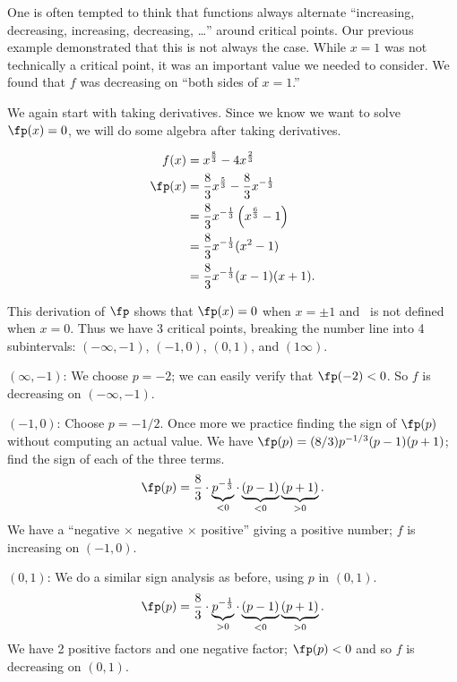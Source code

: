 One is often tempted to think that functions always alternate ``increasing, decreasing, increasing, decreasing, \ldots'' around critical points. Our previous example demonstrated that this is not always the case. While $x=1$ was not technically a critical point, it was an important value we needed to consider. We found that $f$ was decreasing on ``both sides of $x=1$.''

{We again start with taking derivatives. Since we know we want to solve $\fp(x) = 0$, we will do some algebra after taking derivatives.

\begin{align*}
f(x) &= x^{\frac{8}{3}}-4x^{\frac{2}{3}} \\
\fp(x) &= \frac83 x^{\frac53} - \frac83x^{-\frac13}\\
	&= \frac83x^{-\frac13}\left(x^{\frac63}-1\right)\\
	&=\frac83x^{-\frac13}(x^2-1)\\
	&=\frac83x^{-\frac13}(x-1)(x+1).
\end{align*}

This derivation of $\fp$ shows that $\fp(x) = 0$ when $x=\pm 1$ and \fp\ is not defined when $x=0$. Thus we have 3 critical points, breaking the number line into 4 subintervals: $(-\infty,-1)$, $(-1,0)$, $(0,1)$, and $(1\infty)$.

\iflatexml\begin{description}\else\begin{description}[leftmargin=0pt]\fi
\item[Interval 1,] $(\infty,-1)$: We choose $p=-2$; we can easily verify that $\fp(-2)<0$. So $f$ is decreasing on $(-\infty,-1)$.

\item[Interval 2,] $(-1,0)$: Choose $p=-1/2$. Once more we practice finding the sign of $\fp(p)$ without computing an actual value. We have $\fp(p) = (8/3)p^{-1/3}(p-1)(p+1)$; find the sign of each of the three terms. 
	\[\fp(p) = \frac 83 \cdot \underbrace{p^{-\frac13}}_{<0}\cdot \underbrace{(p-1)}_{<0}\underbrace{(p+1)}_{>0}.\]
	We have a ``negative $\times$ negative $\times$ positive'' giving a positive number; $f$ is increasing on $(-1,0)$.

\item[Interval 3,] $(0,1)$: We do a similar sign analysis as before, using $p$ in $(0,1)$.
	\[\fp(p) = \frac 83 \cdot \underbrace{p^{-\frac13}}_{>0}\cdot \underbrace{(p-1)}_{<0}\underbrace{(p+1)}_{>0}.\]
	We have 2 positive factors and one negative factor; $\fp(p)<0$ and so $f$ is decreasing on $(0,1)$.


\end{description}
\end{description}}
